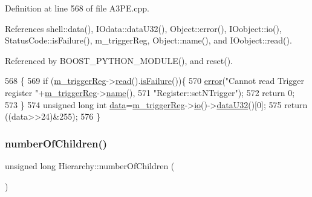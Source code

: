 Definition at line 568 of file A3\+P\+E.\+cpp.



References shell\+::data(), I\+Odata\+::data\+U32(), Object\+::error(), I\+Oobject\+::io(), Status\+Code\+::is\+Failure(), m\+\_\+trigger\+Reg, Object\+::name(), and I\+Oobject\+::read().



Referenced by B\+O\+O\+S\+T\+\_\+\+P\+Y\+T\+H\+O\+N\+\_\+\+M\+O\+D\+U\+L\+E(), and reset().


\begin{DoxyCode}
568                            \{
569   \textcolor{keywordflow}{if} (\hyperlink{classA3PE_a750158ae488121ab7969452f061e678c}{m\_triggerReg}->\hyperlink{classIOobject_aa07610c11963b1db6710e3c76ceea456}{read}().\hyperlink{classStatusCode_a5dd22dc6eb2c52fc4cabc58f6dea2eb7}{isFailure}())\{
570     \hyperlink{classObject_a204a95f57818c0f811933917a30eff45}{error}(\textcolor{stringliteral}{"Cannot read Trigger register "}+\hyperlink{classA3PE_a750158ae488121ab7969452f061e678c}{m\_triggerReg}->\hyperlink{classObject_a300f4c05dd468c7bb8b3c968868443c1}{name}(),
571         \textcolor{stringliteral}{"Register::setNTrigger"});
572     \textcolor{keywordflow}{return} 0;
573   \}
574   \textcolor{keywordtype}{unsigned} \textcolor{keywordtype}{long} \textcolor{keywordtype}{int} \hyperlink{namespaceshell_a5ea2525995cedc3efd69ea8a7f034d1e}{data}=\hyperlink{classA3PE_a750158ae488121ab7969452f061e678c}{m\_triggerReg}->\hyperlink{classIOobject_af04fb94137c3d86849f478ac5afab5d1}{io}()->\hyperlink{classIOdata_ab0e3cd09f46c1c3712f797116f6da074}{dataU32}()[0];
575   \textcolor{keywordflow}{return} ((data>>24)&255);
576 \}
\end{DoxyCode}
\mbox{\label{classHierarchy_ab16e84de65fd84e14001a6cf941c8be4}} 
\subsubsection{\texorpdfstring{number\+Of\+Children()}{numberOfChildren()}}
{\footnotesize\ttfamily unsigned long Hierarchy\+::number\+Of\+Children (\begin{DoxyParamCaption}{ }\end{DoxyParamCaption})\hspace{0.3cm}{\ttfamily [inherited]}}



